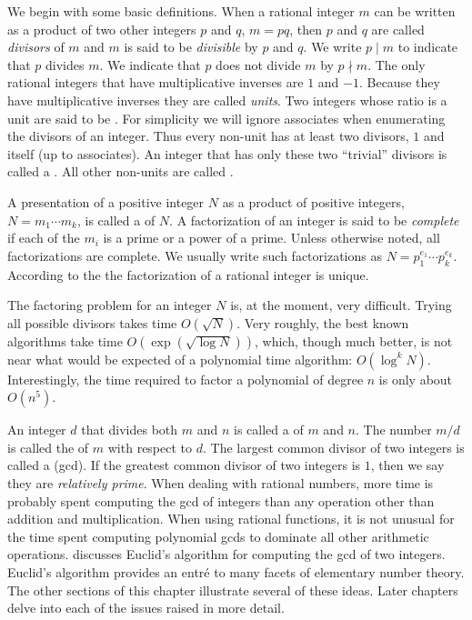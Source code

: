 \medskip
We begin with some basic definitions.  When a rational integer $m$ can
be written as a product of two other integers $p$ and $q$, $m = pq$,
then $p$ and $q$ are called {\em divisors} of $m$ and
$m$ is said to be {\em divisible} by $p$ and
$q$. We write $p \mid m$ to indicate that
$p$ divides $m$.  We indicate that $p$ does not divide $m$ by $p \nmid
m$.  The only rational integers that have multiplicative inverses are
$1$ and $-1$.  Because they have multiplicative inverses they are
called {\em units}. Two integers whose ratio is
a unit are said to be .  For simplicity we will
ignore associates when enumerating the divisors of an integer.  Thus
every non-unit has at least two divisors, $1$ and itself (up to
associates).  An integer that has only these two ``trivial''
divisors is called a .  All other
non-units are called .

A presentation of a positive integer $N$ as a product of positive
integers, $N = m_1 \cdots m_k$, is called a  of
$N$.  A factorization of an integer is said to be {\em
complete} if each of the $m_i$ is a
prime or a power of a prime.  Unless otherwise noted, all
factorizations are complete.  We usually write such factorizations as
$N= p_1^{e_1} \cdots p_k^{e_k}$.  According to the
 the factorization of a
rational integer is unique.

The factoring problem for an integer $N$ is, at the moment, very
difficult.  Trying all possible divisors takes time $O(\sqrt{N})$.
Very roughly, the best known algorithms take time $O(\exp(\sqrt{\log
N}))$, which, though much better, is not near what would be expected
of a polynomial time algorithm: $O(\log^k N)$.  Interestingly, the
time required to factor a polynomial of degree $n$ is only about $O(n^5)$.

An integer $d$ that divides both $m$ and $n$ is called a  of $m$ and $n$.  The number $m/d$ is called the
 of $m$ with respect to $d$.  The largest common
divisor of two integers is called a 
({\sc gcd}).  If the greatest common divisor of two integers is $1$,
then we say they are {\em relatively prime\/}.
When dealing with rational numbers, more time is probably spent
computing the {\sc gcd} of integers than any operation other than
addition and multiplication.  When using rational functions, it is not
unusual for the time spent computing polynomial {\sc gcd}s to dominate
all other arithmetic operations.  
discusses Euclid's algorithm for computing the {\sc gcd} of two
integers.  Euclid's algorithm provides an entr\'e to many facets of
elementary number theory.  The other sections of this chapter
illustrate several of these ideas.  Later chapters delve into each of
the issues raised in more detail.

